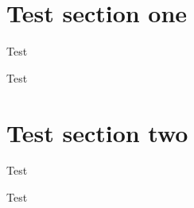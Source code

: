 \documentclass{beamer}
\begin{document}
\section{Test section one}
\begin{frame} Test \end{frame}
\begin{frame} Test \end{frame}
\section{Test section two}
\begin{frame} Test \end{frame}
\begin{frame} Test \end{frame}
\end{document}
